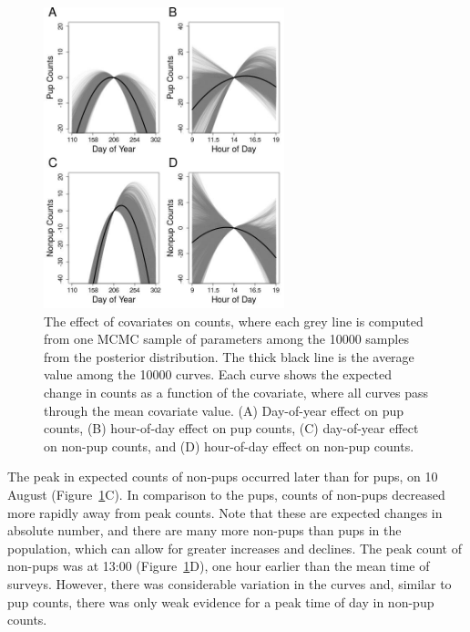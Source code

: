 \documentclass[]{risa}\usepackage[]{graphicx}\usepackage[]{color}
\begin{document}
\begin{figure}[b]
  \centerline{
    \includegraphics[width=2.75in]{plot-covariates-1.jpeg}
  }
  \caption{The effect of covariates on counts, where each grey line is computed from one MCMC sample of parameters among the 10000 samples from the posterior distribution.  The thick black line is the average value among the 10000 curves. Each curve shows the expected change in counts as a function of the covariate, where all curves pass through the mean covariate value. (A) Day-of-year effect on pup counts, (B) hour-of-day effect on pup counts, (C) day-of-year effect on non-pup counts, and (D) hour-of-day effect on non-pup counts.}
\label{plot-covariates}         
\end{figure}

The peak in expected counts of non-pups occurred later than for pups, on 10 August (Figure~\ref{plot-covariates}C). In comparison to the pups, counts of non-pups decreased more rapidly away from peak counts.  Note that these are expected changes in absolute number, and there are many more non-pups than pups in the population, which can allow for greater increases and declines. The peak count of non-pups was at 13:00 (Figure~\ref{plot-covariates}D), one hour earlier than the mean time of surveys. However, there was considerable variation in the curves and, similar to pup counts, there was only weak evidence for a peak time of day in non-pup counts.

\end{document}
